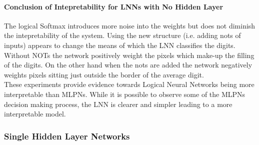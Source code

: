 \paragraph{Conclusion of Intepretability for LNNs with No Hidden Layer}
The logical Softmax introduces more noise into the weights but does not diminish the intepretability of the system. Using the new structure (i.e. adding nots of inputs) appears to change the means of which the LNN classifies the digits. Without NOTs the network positively weight the pixels which make-up the filling of the digits. On the other hand when the nots are added the network negatively weights pixels sitting just outside the border of the average digit.\\

These experiments provide evidence towards Logical Neural Networks being more interpretable than MLPNs. While it is possible to observe some of the MLPNs decision making process, the LNN is clearer and simpler leading to a more interpretable model.

\subsubsection{Single Hidden Layer Networks}

